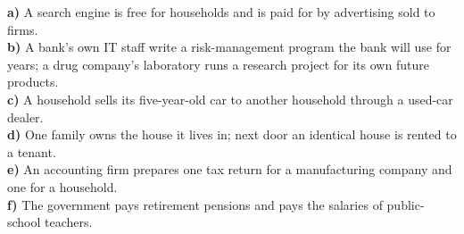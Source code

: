 \noindent\textbf{a)} A search engine is free for households and is paid for by advertising sold to firms.\\
\textbf{b)} A bank's own IT staff write a risk-management program the bank will use for years; a drug company's
laboratory runs a research project for its own future products.\\
\textbf{c)} A household sells its five-year-old car to another household through a used-car dealer.\\
\textbf{d)} One family owns the house it lives in; next door an identical house is rented to a tenant.\\
\textbf{e)} An accounting firm prepares one tax return for a manufacturing company and one for a household.\\
\textbf{f)} The government pays retirement pensions and pays the salaries of public-school teachers.
\resolespaco
